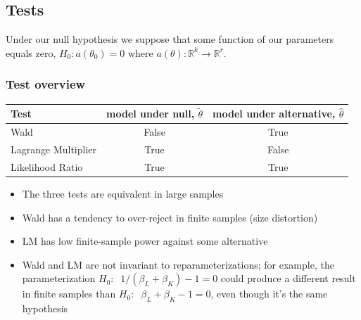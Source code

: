 \documentclass{article}
\begin{document}
\subsection{Tests}
Under our null hypothesis we suppose that some function of our parameters equals zero, $H_0: a(\theta_0) = 0$ where $a(\theta): \mathbb{R}^k \rightarrow \mathbb{R}^r$. 

\subsubsection{Test overview}
\begin{table}[h]
  \begin{center}
  \begin{tabular}{lcc}
       \textbf{Test} & \textbf{model under null, $\tilde{\theta}$} & \textbf{model under alternative, $\hat{\theta}$}\\
       \midrule
      Wald & False & True\\
      Lagrange Multiplier & True & False\\
      Likelihood Ratio & True & True\\
      \bottomrule
  \end{tabular}
  \end{center}
\end{table}
\begin{itemize}
  \item The three tests are equivalent in large samples
  \item Wald has a tendency to over-reject in finite samples (size distortion)
  \item LM has low finite-sample power against some alternative
  \item Wald and LM are not invariant to reparameterizations; for example, the  parameterization $H_0:\;\; 1 /(\beta_L + \beta_K) - 1 = 0$ could produce a different result in finite samples than $H_0:\;\; \beta_L + \beta_K - 1 = 0$, even though it's the same hypothesis
\end{itemize}
\end{document}
